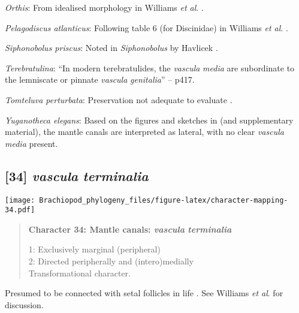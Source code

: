 \documentclass[openany]{book}
\theoremstyle{definition}
\theoremstyle{definition}
\theoremstyle{definition}
\theoremstyle{remark}
\begin{document}
\hypertarget{Orthis-coding-33}{}
\emph{Orthis}: From idealised morphology in Williams \emph{et al}.
\citeyearpar{Williams2000LinguliformeaCraniiformea}.

\hypertarget{Pelagodiscus_atlanticus-coding-33}{}
\emph{Pelagodiscus atlanticus}: Following table 6 (for Discinidae) in
Williams \emph{et al}.
\citeyearpar{Williams2000LinguliformeaCraniiformea}.

\hypertarget{Siphonobolus_priscus-coding-33}{}
\emph{Siphonobolus priscus}: Noted in \emph{Siphonobolus} by Havlicek
\citeyearpar{Havlicek1982LingulaceaPaterinacea}.

\hypertarget{Terebratulina-coding-33}{}
\emph{Terebratulina}: ``In modern terebratulides, the \emph{vascula}
\emph{media} are subordinate to the lemniscate or pinnate \emph{vascula}
\emph{genitalia}'' -- \citet{Williams1997Introduction} p417.

\hypertarget{Tomteluva_perturbata-coding-33}{}
\emph{Tomteluva perturbata}: Preservation not adequate to evaluate
\citep{Streng2016Anew}.

\hypertarget{Yuganotheca_elegans-coding-33}{}
\emph{Yuganotheca elegans}: Based on the figures and sketches in
\citet{Zhang2014Anearly} (and supplementary material), the mantle canals
are interpreted as lateral, with no clear \emph{vascula} \emph{media}
present.

\subsection*{\texorpdfstring{{[}34{]} \emph{vascula}
\emph{terminalia}}{{[}34{]} vascula terminalia}}\label{vascula-terminalia}

\texttt{[image: Brachiopod\_phylogeny\_files/figure-latex/character-mapping-34.pdf]}

\begin{quote}
\textbf{Character 34: Mantle canals: \emph{vascula} \emph{terminalia}}

1: Exclusively marginal (peripheral)\\
2: Directed peripherally and (intero)medially\\
Transformational character.
\end{quote}

Presumed to be connected with setal follicles in life
\citep{Williams1998Thediversity}. See Williams \emph{et al}.
\citeyearpar{Williams2000LinguliformeaCraniiformea} for discussion.
\end{document}
